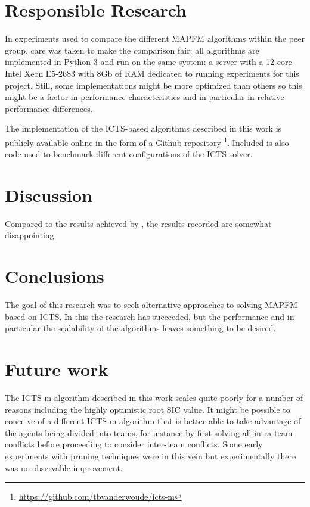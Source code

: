 \documentclass[english]{article}
\begin{document}
	\section{Responsible Research}
	In experiments used to compare the different MAPFM algorithms within the peer group, care was taken to make the comparison fair: all algorithms are implemented in Python 3 and run on the same system: a server with a 12-core Intel Xeon E5-2683 with 8Gb of RAM dedicated to running experiments for this project. Still, some implementations might be more optimized than others so this might be a factor in performance characteristics and in particular in relative performance differences.
	
	The implementation of the ICTS-based algorithms described in this work is publicly available online in the form of a Github repository \footnote{\url{https://github.com/tbvanderwoude/icts-m}}. Included is also code used to benchmark different configurations of the ICTS solver.
	
	\section{Discussion}
	Compared to the results achieved by \cite{ma2016}, the results recorded are somewhat disappointing.
	\section{Conclusions}
	The goal of this research was to seek alternative approaches to solving MAPFM based on ICTS. In this the research has succeeded, but the performance and in particular the scalability of the algorithms leaves something to be desired. 
	\section{Future work}
	The ICTS-m algorithm described in this work scales quite poorly for a number of reasons including the highly optimistic root SIC value. It might be possible to conceive of a different ICTS-m algorithm that is better able to take advantage of the agents being divided into teams, for instance by first solving all intra-team conflicts before proceeding to consider inter-team conflicts. Some early experiments with pruning techniques were in this vein but experimentally there was no observable improvement.
	\printbibliography
	
\end{document}
